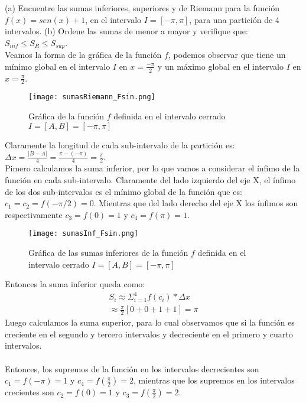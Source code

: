 			\begin{ejer}[3]
			    (a) Encuentre las sumas inferiores, superiores y de Riemann para la función $f(x) = sen(x) + 1$, en el intervalo $I = [-\pi, \pi]$, para una partición de 4 intervalos. (b) Ordene las sumas de menor a mayor y verifique que: $S_{inf} \leq S_R \leq S_{sup}$. \\
			    Veamos la forma de la gráfica de la función $f$, podemos observar que tiene un mínimo global en el intervalo $I$ en $x = \frac{-\pi}{2}$ y un máximo global en el intervalo $I$ en $x = \frac{\pi}{2}$. 
			    \begin{figure}[h]
				    \texttt{[image: sumasRiemann\_Fsin.png]}
				    \caption{Gráfica de la función $f$ definida en el intervalo cerrado $I = [A,B] = [-\pi,\pi]$}
			    \end{figure}
			    Claramente la longitud de cada sub-intervalo de la partición es: $\Delta x = \frac{|B-A|}{4} = \frac{\pi - (-\pi)}{4} = \frac{\pi}{2}$. \\ 
			    Pimero calculamos la suma inferior, por lo que vamos a considerar el ínfimo de la función en cada sub-intervalo. Claramente del lado izquierdo del eje X, el ínfimo de los dos sub-intervalos es el mínimo global de la función que es: $c_1 = c_2 = f(-\pi/2) = 0$. Mientras que del lado derecho del eje X los ínfimos son respectivamente $c_3 = f(0) = 1$ y $c_4 = f(\pi) = 1$.  \\
			    \begin{figure}[h]
				    \texttt{[image: sumasInf\_Fsin.png]}
				    \caption{Gráfica de las sumas inferiores de la función $f$ definida en el intervalo cerrado $I = [A,B] = [-\pi,\pi]$}
			    \end{figure}
			    Entonces la suma inferior queda como: \\
			    \begin{eqnarray*}
			        S_i \approx \Sigma_{i=1}^4 f(c_i) * \Delta x \\
			        \approx \frac{\pi}{2} [0 + 0 + 1 + 1] = \pi 
			    \end{eqnarray*}
			    Luego calculamos la suma superior, para lo cual observamos que si la función es creciente en el segundo y tercero intervalos y decreciente en el primero y cuarto intervalos. \\ \\ Entonces, los supremos de la función en los  intervalos decrecientes son $c_1 = f(-\pi) = 1$ y $c_4 = f(\frac{\pi}{2}) = 2 $, mientras que los supremos en los intervalos crecientes son $c_2 = f(0) = 1 $ y $c_3 = f(\frac{\pi}{2}) = 2 $.\\

\end{ejer}
